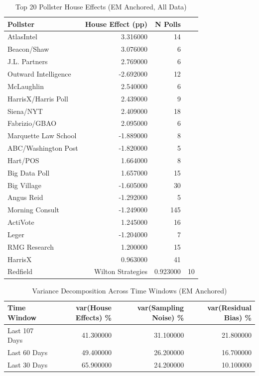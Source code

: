 \begin{table}
\caption{Top 20 Pollster House Effects (EM Anchored, All Data)}
\begin{tabular}{lrr}
\toprule
Pollster & House Effect (pp) & N Polls \\
\midrule
AtlasIntel & 3.316000 & 14 \\
Beacon/Shaw & 3.076000 & 6 \\
J.L. Partners & 2.769000 & 6 \\
Outward Intelligence & -2.692000 & 12 \\
McLaughlin & 2.540000 & 6 \\
HarrisX/Harris Poll & 2.439000 & 9 \\
Siena/NYT & 2.409000 & 18 \\
Fabrizio/GBAO & 2.095000 & 6 \\
Marquette Law School & -1.889000 & 8 \\
ABC/Washington Post & -1.820000 & 5 \\
Hart/POS & 1.664000 & 8 \\
Big Data Poll & 1.657000 & 15 \\
Big Village & -1.605000 & 30 \\
Angus Reid & -1.292000 & 5 \\
Morning Consult & -1.249000 & 145 \\
ActiVote & 1.245000 & 16 \\
Leger & -1.204000 & 7 \\
RMG Research & 1.200000 & 15 \\
HarrisX & 0.963000 & 41 \\
Redfield & Wilton Strategies & 0.923000 & 10 \\
\bottomrule
\end{tabular}
\end{table}


\begin{table}
\caption{Variance Decomposition Across Time Windows (EM Anchored)}
\begin{tabular}{lrrr}
\toprule
Time Window & var(House Effects) \% & var(Sampling Noise) \% & var(Residual Bias) \% \\
\midrule
Last 107 Days & 41.300000 & 31.100000 & 21.800000 \\
Last 60 Days & 49.400000 & 26.200000 & 16.700000 \\
Last 30 Days & 65.900000 & 24.200000 & 10.100000 \\
\bottomrule
\end{tabular}
\end{table}
